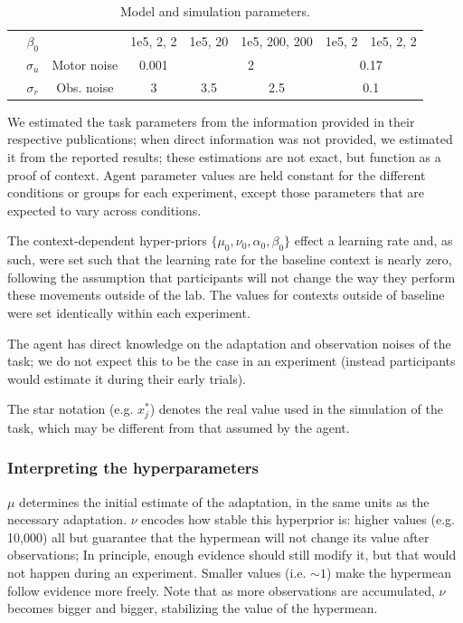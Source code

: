 \documentclass[a4paper,doc,floatsintext,natbib]{apa6}
\begin{document}
\begin{table}[h!]
{\begin{tabular}{|c|c|c|c|c|c|c|c|c|c|c|}
  \cline{2-2} \cline{4-11}
  & $\beta_0$ & & 1e5, 2, 2 & \multicolumn{2}{c|}{1e5, 20} & \multicolumn{2}{c|}{1e5, 200, 200} & \multicolumn{2}{c|}{1e5, 2} & 1e5, 2, 2 \\
  \cline{2-11}
  & $\sigma_u$ & Motor noise & 0.001 & \multicolumn{4}{c|}{2} & \multicolumn{3}{c|}{0.17} \\
  \cline{2-11}
  & $\sigma_r$& Obs. noise & 3 & \multicolumn{2}{c|}{3.5} & \multicolumn{2}{c|}{2.5} & \multicolumn{3}{c|}{0.1} \\
  \cline{1-11}
  \end{tabular}}
\caption{Model and simulation parameters.}
\label{tab:parameters}
\end{table}

We estimated the task parameters from the information provided in their respective publications; when direct information was not provided, we estimated it from the reported results; these estimations are not exact, but function as a proof of context. Agent parameter values are held constant for the different conditions or groups for each experiment, except those parameters that are expected to vary across conditions.

The context-dependent hyper-priors $\{\mu_0, \nu_0, \alpha_0, \beta_0\}$ effect a learning rate and, as such, were set such that the learning rate for the baseline context is nearly zero, following the assumption that participants will not change the way they perform these movements outside of the lab. The values for contexts outside of baseline were set identically within each experiment.


The agent has direct knowledge on the adaptation and observation noises of the task; we do not expect this to be the case in an experiment (instead participants would estimate it during their early trials). 

The star notation (e.g. $x_j^*$) denotes the real value used in the simulation of the task, which may be different from that assumed by the agent.

\subsubsection{Interpreting the hyperparameters}
\label{sec:interpreting-hyperparameters}
$\mu$ determines the initial estimate of the adaptation, in the same units as
the necessary adaptation. $\nu$ encodes how stable this hyperprior is: higher
values (e.g. 10,000) all but guarantee that the hypermean will not change its
value after observations; In principle, enough evidence should still modify it,
but that would not happen during an experiment. Smaller values (i.e. $\sim 1$)
make the hypermean follow evidence more freely. Note that as more observations
are accumulated, $\nu$ becomes bigger and bigger, stabilizing the value of the
hypermean.
\end{document}
